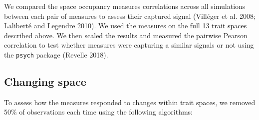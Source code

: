 \documentclass[]{article}
\begin{document}
We compared the space occupancy measures correlations across all
simulations between each pair of measures to assess
\textcolor{black}{their} captured signal (Villéger et al.
2008; Laliberté and Legendre 2010). We used the measures on the full 13
\textcolor{black}{trait spaces} described above. We then
scaled the results and measured the pairwise Pearson correlation to test
whether measures were capturing a similar signals or not using the
\texttt{psych} package (Revelle 2018).

\subsection{Changing space}\label{changing-spaces}

To assess how the measures responded to changes within
\textcolor{black}{trait spaces}, we removed 50\% of
observations each time using the following algorithms:
\end{document}
